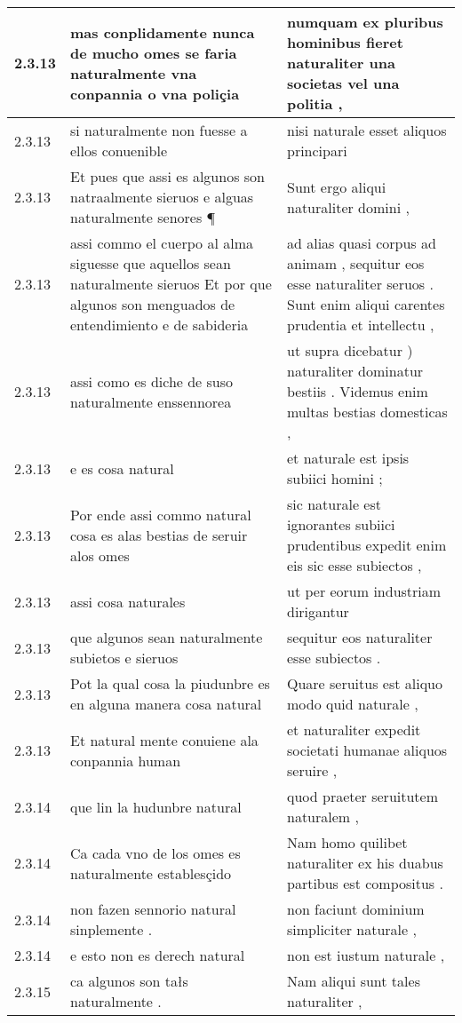 \begin{tabular}{|p{1cm}|p{6.5cm}|p{6.5cm}|}
2.3.13 & mas conplidamente nunca de mucho omes se faria naturalmente vna conpannia o vna poliçia & numquam ex pluribus hominibus fieret naturaliter una societas vel una politia , \\\hline
2.3.13 & si naturalmente non fuesse a ellos conuenible & nisi naturale esset aliquos principari \\\hline
2.3.13 & Et pues que assi es algunos son natraalmente sieruos e alguas naturalmente senores ¶ & Sunt ergo aliqui naturaliter domini , \\\hline
2.3.13 & assi commo el cuerpo al alma siguesse que aquellos sean naturalmente sieruos Et por que algunos son menguados de entendimiento e de sabideria & ad alias quasi corpus ad animam , sequitur eos esse naturaliter seruos . Sunt enim aliqui carentes prudentia et intellectu , \\\hline
2.3.13 & assi como es diche de suso naturalmente enssennorea & ut supra dicebatur ) naturaliter dominatur bestiis . Videmus enim multas bestias domesticas , \\\hline
2.3.13 & e es cosa natural & et naturale est ipsis subiici homini ; \\\hline
2.3.13 & Por ende assi commo natural cosa es alas bestias de seruir alos omes & sic naturale est ignorantes subiici prudentibus expedit enim eis sic esse subiectos , \\\hline
2.3.13 & assi cosa naturales & ut per eorum industriam dirigantur \\\hline
2.3.13 & que algunos sean naturalmente subietos e sieruos & sequitur eos naturaliter esse subiectos . \\\hline
2.3.13 & Pot la qual cosa la piudunbre es en alguna manera cosa natural & Quare seruitus est aliquo modo quid naturale , \\\hline
2.3.13 & Et natural mente conuiene ala conpannia human & et naturaliter expedit societati humanae aliquos seruire , \\\hline
2.3.14 & que lin la hudunbre natural & quod praeter seruitutem naturalem , \\\hline
2.3.14 & Ca cada vno de los omes es naturalmente establesçido & Nam homo quilibet naturaliter ex his duabus partibus est compositus . \\\hline
2.3.14 & non fazen sennorio natural sinplemente . & non faciunt dominium simpliciter naturale , \\\hline
2.3.14 & e esto non es derech natural & non est iustum naturale , \\\hline
2.3.15 & ca algunos son tałs naturalmente . & Nam aliqui sunt tales naturaliter , \\\hline

\end{tabular}
